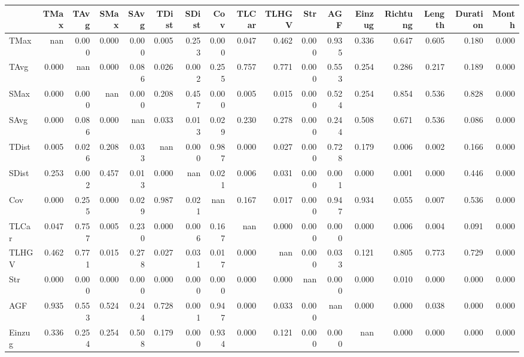 \begin{tabular}{lrrrrrrrrrrrrrrrr}
\toprule
{} &  TMax &  TAvg &  SMax &  SAvg &  TDist &  SDist &   Cov &  TLCar &  TLHGV &   Str &   AGF &  Einzug &  Richtung &  Length &  Duration &  Month \\
\midrule
TMax     &   nan & 0.000 & 0.000 & 0.000 &  0.005 &  0.253 & 0.000 &  0.047 &  0.462 & 0.000 & 0.935 &   0.336 &     0.647 &   0.605 &     0.180 &  0.000 \\
TAvg     & 0.000 &   nan & 0.000 & 0.086 &  0.026 &  0.002 & 0.255 &  0.757 &  0.771 & 0.000 & 0.553 &   0.254 &     0.286 &   0.217 &     0.189 &  0.000 \\
SMax     & 0.000 & 0.000 &   nan & 0.000 &  0.208 &  0.457 & 0.000 &  0.005 &  0.015 & 0.000 & 0.524 &   0.254 &     0.854 &   0.536 &     0.828 &  0.000 \\
SAvg     & 0.000 & 0.086 & 0.000 &   nan &  0.033 &  0.013 & 0.029 &  0.230 &  0.278 & 0.000 & 0.244 &   0.508 &     0.671 &   0.536 &     0.086 &  0.000 \\
TDist    & 0.005 & 0.026 & 0.208 & 0.033 &    nan &  0.000 & 0.987 &  0.000 &  0.027 & 0.000 & 0.728 &   0.179 &     0.006 &   0.002 &     0.166 &  0.000 \\
SDist    & 0.253 & 0.002 & 0.457 & 0.013 &  0.000 &    nan & 0.021 &  0.006 &  0.031 & 0.000 & 0.001 &   0.000 &     0.001 &   0.000 &     0.446 &  0.000 \\
Cov      & 0.000 & 0.255 & 0.000 & 0.029 &  0.987 &  0.021 &   nan &  0.167 &  0.017 & 0.000 & 0.947 &   0.934 &     0.055 &   0.007 &     0.536 &  0.000 \\
TLCar    & 0.047 & 0.757 & 0.005 & 0.230 &  0.000 &  0.006 & 0.167 &    nan &  0.000 & 0.000 & 0.000 &   0.000 &     0.006 &   0.004 &     0.091 &  0.000 \\
TLHGV    & 0.462 & 0.771 & 0.015 & 0.278 &  0.027 &  0.031 & 0.017 &  0.000 &    nan & 0.000 & 0.033 &   0.121 &     0.805 &   0.773 &     0.729 &  0.000 \\
Str      & 0.000 & 0.000 & 0.000 & 0.000 &  0.000 &  0.000 & 0.000 &  0.000 &  0.000 &   nan & 0.000 &   0.000 &     0.010 &   0.000 &     0.000 &  0.000 \\
AGF      & 0.935 & 0.553 & 0.524 & 0.244 &  0.728 &  0.001 & 0.947 &  0.000 &  0.033 & 0.000 &   nan &   0.000 &     0.000 &   0.038 &     0.000 &  0.000 \\
Einzug   & 0.336 & 0.254 & 0.254 & 0.508 &  0.179 &  0.000 & 0.934 &  0.000 &  0.121 & 0.000 & 0.000 &     nan &     0.000 &   0.000 &     0.000 &  0.000 \\

\end{tabular}
